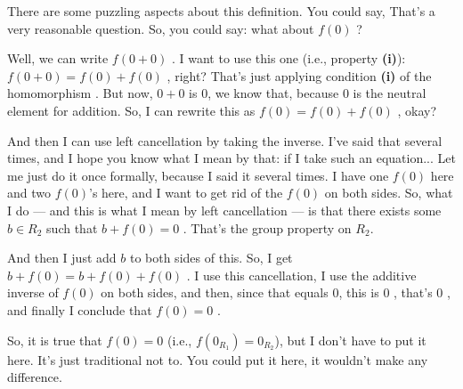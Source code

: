 \begin{speech}[00:20:03 - 00:22:25]
There are some puzzling aspects about this definition. You could say,  That's a very reasonable question. So, you could say: what about $f(0)$ ?

Well, we can write $f(0 + 0)$ . I want to use this one (i.e., property \textbf{(i)}): $f(0 + 0) = f(0) + f(0)$ , right? That's just applying condition \textbf{(i)} of the homomorphism . But now, $0 + 0$ is $0$, we know that, because $0$ is the neutral element for addition. So, I can rewrite this as $f(0) = f(0) + f(0)$ , okay?

And then I can use left cancellation by taking the inverse. I've said that several times, and I hope you know what I mean by that: if I take such an equation... Let me just do it once formally, because I said it several times. I have one $f(0)$ here and two $f(0)$'s here, and I want to get rid of the $f(0)$ on both sides. So, what I do --- and this is what I mean by left cancellation --- is that there exists some $b \in R_2$ such that $b + f(0) = 0$ . That's the group property on $R_2$.

And then I just add $b$ to both sides of this. So, I get $b + f(0) = b + f(0) + f(0)$ . I use this cancellation, I use the additive inverse of $f(0)$ on both sides, and then, since that equals $0$, this is $0$ , that's $0$ , and finally I conclude that $f(0) = 0$ .

So, it is true that $f(0) = 0$ (i.e., $f(0_{R_1}) = 0_{R_2}$), but I don't have to put it here. It's just traditional not to. You could put it here, it wouldn't make any difference.
\end{speech}

